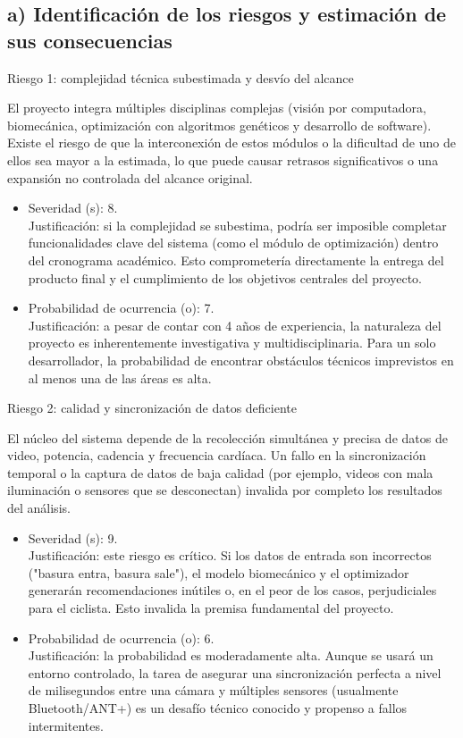\documentclass[
11pt, %
]{charter}
\begin{document}
\subsection*{a) Identificación de los riesgos y estimación de sus consecuencias}

Riesgo 1: complejidad técnica subestimada y desvío del alcance

El proyecto integra múltiples disciplinas complejas (visión por computadora, biomecánica, optimización con algoritmos genéticos y desarrollo de software). Existe el riesgo de que la interconexión de estos módulos o la dificultad de uno de ellos sea mayor a la estimada, lo que puede causar retrasos significativos o una expansión no controlada del alcance original.
\begin{itemize}
  \item Severidad (s): 8.\\
  Justificación: si la complejidad se subestima, podría ser imposible completar funcionalidades clave del sistema (como el módulo de optimización) dentro del cronograma académico. Esto comprometería directamente la entrega del producto final y el cumplimiento de los objetivos centrales del proyecto.
  \item Probabilidad de ocurrencia (o): 7.\\
  Justificación: a pesar de contar con 4 años de experiencia, la naturaleza del proyecto es inherentemente investigativa y multidisciplinaria. Para un solo desarrollador, la probabilidad de encontrar obstáculos técnicos imprevistos en al menos una de las áreas es alta.
\end{itemize}   

Riesgo 2: calidad y sincronización de datos deficiente

El núcleo del sistema depende de la recolección simultánea y precisa de datos de video, potencia, cadencia y frecuencia cardíaca. Un fallo en la sincronización temporal o la captura de datos de baja calidad (por ejemplo, videos con mala iluminación o sensores que se desconectan) invalida por completo los resultados del análisis.
\begin{itemize}
  \item Severidad (s): 9.\\
  Justificación: este riesgo es crítico. Si los datos de entrada son incorrectos ("basura entra, basura sale"), el modelo biomecánico y el optimizador generarán recomendaciones inútiles o, en el peor de los casos, perjudiciales para el ciclista. Esto invalida la premisa fundamental del proyecto.
  \item Probabilidad de ocurrencia (o): 6.\\
  Justificación: la probabilidad es moderadamente alta. Aunque se usará un entorno controlado, la tarea de asegurar una sincronización perfecta a nivel de milisegundos entre una cámara y múltiples sensores (usualmente Bluetooth/ANT+) es un desafío técnico conocido y propenso a fallos intermitentes.
\end{itemize}
\end{document}
